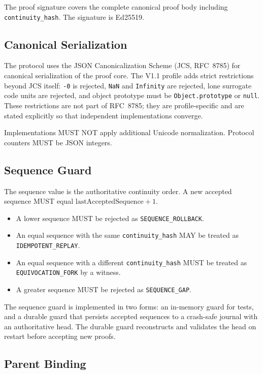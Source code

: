 \documentclass[11pt,a4paper]{article}
\begin{document}
The proof signature covers the complete canonical proof body including \texttt{continuity\_hash}. The signature is Ed25519.

\subsection{Canonical Serialization}

The protocol uses the JSON Canonicalization Scheme (JCS, RFC~8785) for canonical serialization of the proof core. The V1.1 profile adds strict restrictions beyond JCS itself: \texttt{-0} is rejected, \texttt{NaN} and \texttt{Infinity} are rejected, lone surrogate code units are rejected, and object prototype must be \texttt{Object.prototype} or \texttt{null}. These restrictions are not part of RFC~8785; they are profile-specific and are stated explicitly so that independent implementations converge.

Implementations MUST NOT apply additional Unicode normalization. Protocol counters MUST be JSON integers.

\subsection{Sequence Guard}

The sequence value is the authoritative continuity order. A new accepted sequence MUST equal $\mathrm{lastAcceptedSequence} + 1$.

\begin{itemize}
\item A lower sequence MUST be rejected as \texttt{SEQUENCE\_ROLLBACK}.
\item An equal sequence with the same \texttt{continuity\_hash} MAY be treated as \texttt{IDEMPOTENT\_REPLAY}.
\item An equal sequence with a different \texttt{continuity\_hash} MUST be treated as \texttt{EQUIVOCATION\_FORK} by a witness.
\item A greater sequence MUST be rejected as \texttt{SEQUENCE\_GAP}.
\end{itemize}

The sequence guard is implemented in two forms: an in-memory guard for tests, and a durable guard that persists accepted sequences to a crash-safe journal with an authoritative head. The durable guard reconstructs and validates the head on restart before accepting new proofs.

\subsection{Parent Binding}
\end{document}
